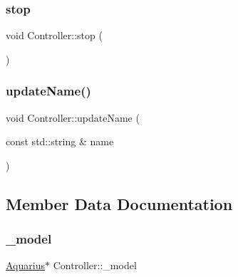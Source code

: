 \subsubsection{\texorpdfstring{stop}{stop}}
{\footnotesize\ttfamily void Controller\+::stop (\begin{DoxyParamCaption}{ }\end{DoxyParamCaption})\hspace{0.3cm}{\ttfamily [slot]}}

\mbox{\label{classController_af3a40c18aa5bda6b842b361525391500_af3a40c18aa5bda6b842b361525391500}} 
\subsubsection{\texorpdfstring{update\+Name()}{updateName()}}
{\footnotesize\ttfamily void Controller\+::update\+Name (\begin{DoxyParamCaption}\item[{const std\+::string \&}]{name }\end{DoxyParamCaption})}



\subsection{Member Data Documentation}
\mbox{\label{classController_a01f4c88c2a9b59ef6f9abf4f41351140_a01f4c88c2a9b59ef6f9abf4f41351140}} 
\subsubsection{\texorpdfstring{\+\_\+model}{\_model}}
{\footnotesize\ttfamily \hyperlink{classAquarius}{Aquarius}$\ast$ Controller\+::\+\_\+model\hspace{0.3cm}{\ttfamily [private]}}

\mbox{\label{classController_a17ee08bcd34becc157003361c5989400_a17ee08bcd34becc157003361c5989400}} 
